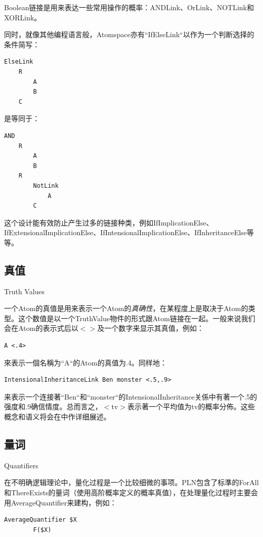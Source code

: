 Boolean链接是用来表达一些常用操作的概率：ANDLink、OrLink、NOTLink和XORLink。

同时，就像其他编程语言般，Atomspace亦有“IfElseLink“以作为一个判断选择的条件简写：

\begin{verbatim}
ElseLink
	R
		A
		B
	C
\end{verbatim}

是等同于：

\begin{verbatim}
AND
	R
		A
		B
	R
		NotLink
			A
		C
\end{verbatim}

\noindent 这个设计能有效防止产生过多的链接种类，例如IfImplicationElse、IfExtensionalImplicationElse、IfIntensionalImplicationElse、IfInheritanceElse等等。
	
		
\subsection{真值}{Truth Values}
\label{真值}

一个Atom的真值是用来表示一个Atom的\textit{真确性}，在某程度上是取决于Atom的类型。这个数值是以一个TruthValue物件的形式跟Atom链接在一起。一般来说我们会在Atom的表示式后以\ensuremath{<}\ensuremath{>}及一个数字来显示其真值，例如：

\begin{verbatim}
A <.4>
\end{verbatim}

來表示一個名稱为“A“的Atom的真值为.4。同样地：

\begin{verbatim}
IntensionalInheritanceLink Ben monster <.5,.9>
\end{verbatim}

\noindent 来表示一个连接著“Ben“和“monster“的IntensionalInheritance关係中有著一个.5的强度和.9确信情度。总而言之，\ensuremath{<}tv\ensuremath{>}表示著一个平均值为tv的概率分佈。这些概念和语义将会在\cite{PLN}中作详细展述。

\subsection{量词}{Quantiﬁers}  

在不明确逻辑理论中，量化过程是一个比较细微的事项。PLN包含了标準的ForAll和ThereExists的量词（使用高阶概率定义的概率真值），在处理量化过程时主要会用AverageQuantifier来建构，例如：

\begin{verbatim}
AverageQuantifier $X
        F($X)
\end{verbatim}

